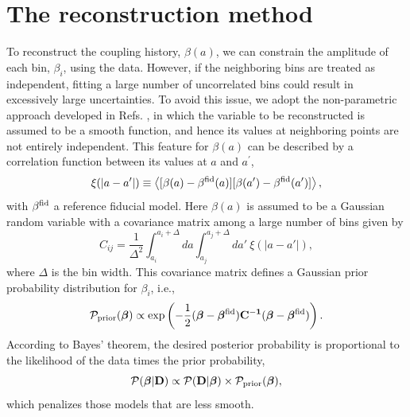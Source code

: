 \documentclass[a4paper,11pt]{article}
\begin{document}
\section{The reconstruction method}\label{sec:method}
To reconstruct the coupling history, $\beta(a)$, we can constrain the amplitude of each bin, $\beta_i$, using the data. However, if the neighboring bins are treated as independent, fitting a large number of uncorrelated bins could result in excessively large uncertainties. To avoid this issue, we adopt the non-parametric approach developed in Refs. \cite{Crittenden:2005wj,Zhao:2012aw}, in which the variable to be reconstructed is assumed to be a smooth function, and hence its values at neighboring points are not entirely independent. This feature for $\beta(a)$ can be described by a correlation function between its values at $a$ and $a^\prime$,
\begin{equation}
\xi(|a-a^\prime|) \equiv \left<  [\beta(a)-\beta^{\rm fid}(a)][\beta(a^\prime)-
\beta^{\rm fid}(a^\prime)] \right>,
\end{equation}
with $\beta^{\rm fid}$ a reference fiducial model. Here $\beta(a)$ is assumed to be a Gaussian random variable with a covariance matrix among a large number of bins given by
\begin{equation}\label{eq:Cij} 
  C_{ij}=\frac{1}{\Delta^2}\int_{a_i}^{a_i+\Delta}da \int_{a_j}^{a_j+\Delta}da'~\xi (|a - a'|),
\end{equation}
where $\Delta$ is the bin width. This covariance matrix defines a Gaussian prior probability distribution for $\beta_i$, i.e.,
\begin{equation}\label{eq:prior}
\mathcal{P}_{\rm prior}(\bm{ \beta}) \propto \exp\left( -\frac{1}{2}(\bm{\beta}-\bm{\beta}^{\rm fid})
\bf{C}^{-1} (\bm{\beta}-\bm{\beta}^{\rm fid} ) \right).
\end{equation}
According to Bayes' theorem, the desired posterior probability is proportional to the likelihood of the data times the prior probability, 
\begin{equation}
{\cal P}(\bm{\beta}|{\bf D}) \propto {\cal P}({\bf D}|\bm {\beta}) \times {\cal P}_{\rm prior}(\bm {\beta}),
\end{equation}
which penalizes those models that are less smooth. 
\end{document}
